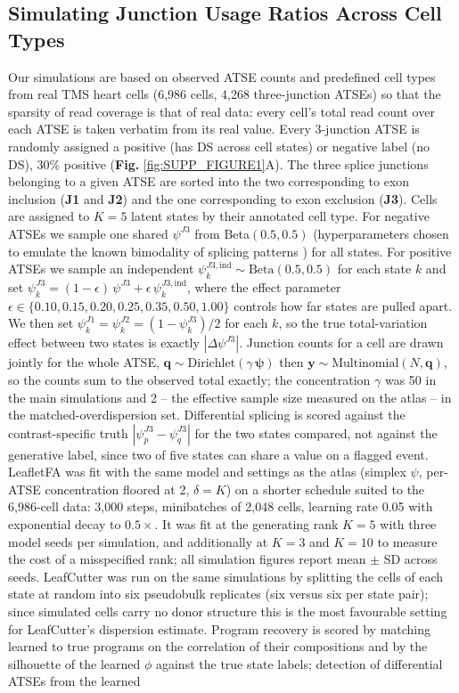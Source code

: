 \subsection*{Simulating Junction Usage Ratios Across Cell Types}\label{sec:simulation_method}

Our simulations are based on observed ATSE counts and predefined cell types from real TMS heart cells (6{,}986 cells, 4{,}268 three-junction ATSEs) so that the sparsity of read coverage is that of real data: every cell's total read count over each ATSE is taken verbatim from its real value. Every 3-junction ATSE is randomly assigned a positive (has DS across cell states) or negative label (no DS), 30\% positive (\textbf{Fig.} \ref{fig:SUPP_FIGURE1}A). The three splice junctions belonging to a given ATSE are sorted into the two corresponding to exon inclusion (\textbf{J1} and \textbf{J2}) and the one corresponding to exon exclusion (\textbf{J3}). Cells are assigned to $K=5$ latent states by their annotated cell type. For negative ATSEs we sample one shared $\psi^{J3}$ from Beta$(0.5,0.5)$ (hyperparameters chosen to emulate the known bimodality of splicing patterns \cite{NirYosefCoverage}) for all states. For positive ATSEs we sample an independent $\psi^{J3,\mathrm{ind}}_k \sim \text{Beta}(0.5,0.5)$ for each state $k$ and set $\psi^{J3}_k = (1-\epsilon)\,\psi^{J3} + \epsilon\,\psi^{J3,\mathrm{ind}}_k$, where the effect parameter $\epsilon \in \{0.10, 0.15, 0.20, 0.25, 0.35, 0.50, 1.00\}$ controls how far states are pulled apart. We then set \( \psi^{J1}_k = \psi^{J2}_k = (1-\psi^{J3}_k)/2 \) for each $k$, so the true total-variation effect between two states is exactly $|\Delta\psi^{J3}|$. Junction counts for a cell are drawn jointly for the whole ATSE, $\mathbf{q} \sim \text{Dirichlet}(\gamma\,\boldsymbol{\psi})$ then $\mathbf{y} \sim \text{Multinomial}(N, \mathbf{q})$, so the counts sum to the observed total exactly; the concentration $\gamma$ was 50 in the main simulations and 2 -- the effective sample size measured on the atlas -- in the matched-overdispersion set. Differential splicing is scored against the contrast-specific truth $|\psi^{J3}_p - \psi^{J3}_q|$ for the two states compared, not against the generative label, since two of five states can share a value on a flagged event. LeafletFA was fit with the same model and settings as the atlas (simplex $\psi$, per-ATSE concentration floored at 2, $\delta = K$) on a shorter schedule suited to the 6{,}986-cell data: 3{,}000 steps, minibatches of 2{,}048 cells, learning rate 0.05 with exponential decay to $0.5\times$. It was fit at the generating rank $K=5$ with three model seeds per simulation, and additionally at $K=3$ and $K=10$ to measure the cost of a misspecified rank; all simulation figures report mean $\pm$ SD across seeds. LeafCutter was run on the same simulations by splitting the cells of each state at random into six pseudobulk replicates (six versus six per state pair); since simulated cells carry no donor structure this is the most favourable setting for LeafCutter's dispersion estimate. Program recovery is scored by matching learned to true programs on the correlation of their compositions and by the silhouette of the learned $\phi$ against the true state labels; detection of differential ATSEs from the learned 